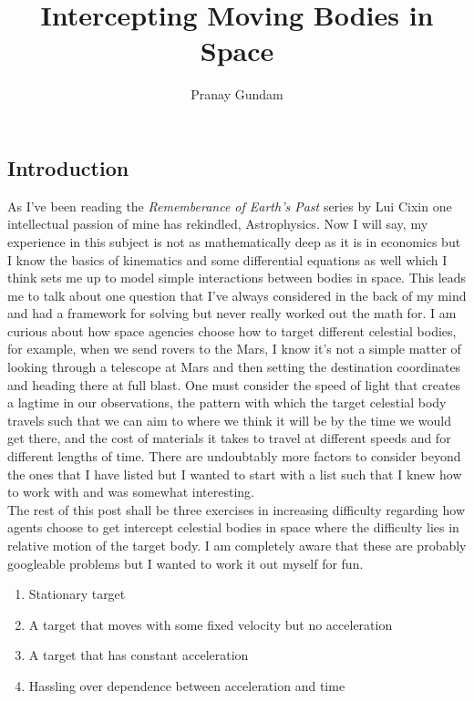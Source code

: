 \documentclass[11pt,english]{article}
\title{\textbf{Intercepting Moving Bodies in Space}}
\author{Pranay Gundam}
\begin{document}
\maketitle

\subsection*{Introduction}

\noindent As I've been reading the \textit{Rememberance of Earth's Past} series by Lui Cixin one intellectual passion of mine has rekindled, Astrophysics. Now I will say, my experience in this subject is not as mathematically deep as it is in economics but I know the basics of kinematics and some differential equations as well which I think sets me up to model simple interactions between bodies in space. This leads me to talk about one question that I've always considered in the back of my mind and had a framework for solving but never really worked out the math for. I am curious about how space agencies choose how to target different celestial bodies, for example, when we send rovers to the Mars, I know it's not a simple matter of looking through a telescope at Mars and then setting the destination coordinates and heading there at full blast. One must consider the speed of light that creates a lagtime in our observations, the pattern with which the target celestial body travels such that we can aim to where we think it will be by the time we would get there, and the cost of materials it takes to travel at different speeds and for different lengths of time. There are undoubtably more factors to consider beyond the ones that I have listed but I wanted to start with a list such that I knew how to work with and was somewhat interesting.\\

\noindent The rest of this post shall be three exercises in increasing difficulty regarding how agents choose to get intercept celestial bodies in space where the difficulty lies in relative motion of the target body. I am completely aware that these are probably googleable problems but I wanted to work it out myself for fun.
\begin{enumerate}
	\item Stationary target 
	\item A target that moves with some fixed velocity but no acceleration
	\item A target that has constant acceleration
	\item Hassling over dependence between acceleration and time
\end{enumerate}
\end{document}
